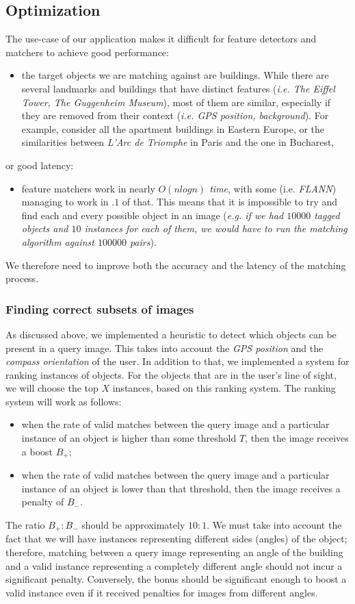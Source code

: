 \documentclass[a4paper,onecolumn,oneside,titlepage,11pt]{report}
\begin{document}
\subsection{Optimization}
The use-case of our application makes it difficult for feature detectors and matchers to achieve good performance:
\begin{itemize}
	\item the target objects we are matching against are buildings. While there are several landmarks and buildings that have distinct features (\emph{i.e. The Eiffel Tower, The Guggenheim Museum}), most of them are similar, especially if they are removed from their context (\emph{i.e. GPS position, background}). For example, consider all the apartment buildings in Eastern Europe, or the similarities between \emph{L'Arc de Triomphe} in Paris and the one in Bucharest,
\end{itemize}
or good latency:
\begin{itemize}
	\item feature matchers work in nearly \emph{$O(nlogn)$ time}, with some (i.e. \emph{FLANN}) managing to work in $.1$ of that. This means that it is impossible to try and find each and every possible object in an image (\emph{e.g. if we had $10000$ tagged objects and $10$ instances for each of them, we would have to run the matching algorithm against $100000$ pairs}).
\end{itemize}
We therefore need to improve both the accuracy and the latency of the matching process.

\subsubsection{Finding correct subsets of images}
As discussed above, we implemented a heuristic to detect which objects can be present in a query image. This takes into account the \emph{GPS position} and the \emph{compass orientation} of the user.
In addition to that, we implemented a system for ranking instances of objects. For the objects that are in the user's line of sight, we will choose the top $X$ instances, based on this ranking system.
The ranking system will work as follows:
\begin{itemize}
	\item when the rate of valid matches between the query image and a particular instance of an object is higher than some threshold $T$, then the image receives a boost $B_+$;
	\item when the rate of valid matches between the query image and a particular instance of an object is lower than that threshold, then the image receives a penalty of $B_-$.
\end{itemize}
The ratio $B_+ : B_-$ should be approximately $10 : 1$. We must take into account the fact that we will have instances representing different sides (angles) of the object; therefore, matching between a query image representing an angle of the building and a valid instance representing a completely different angle should not incur a significant penalty. Conversely, the bonus should be significant enough to boost a valid instance even if it received penalties for images from different angles.
\end{document}
